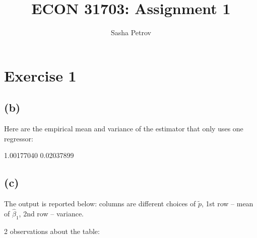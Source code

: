 \documentclass[a4paper,12pt,twoside]{article}
\title{ECON 31703: Assignment 1}
\author{Sasha Petrov}
\begin{document}


\maketitle


\section*{Exercise 1}


\subsection*{(b)}

Here are the empirical mean and variance of the estimator that only uses one regressor:

\begin{Schunk}
\begin{Soutput}
[1] 1.00177040 0.02037899
\end{Soutput}
\end{Schunk}


\subsection*{(c)}

The output is reported below: columns are different choices of $\tilde p$, 1st row -- mean of $\hat\beta_1$, 2nd row -- variance.

2 observations about the table:
\end{document}
